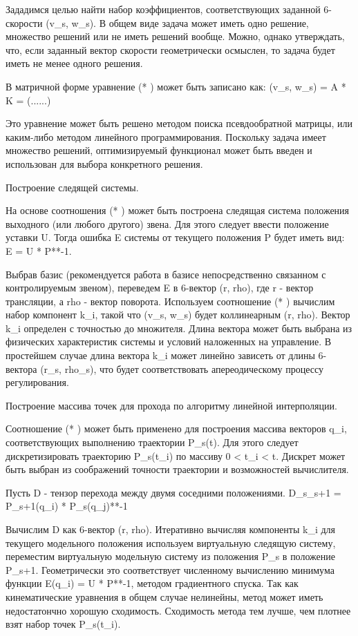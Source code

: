 \documentclass[12pt,a4paper,titlepage]{article}
\begin{document}
Зададимся целью найти набор коэффициентов, соответствующих заданной 6-скорости (v\_s, w\_s). В общем виде задача может иметь одно решение, множество решений или не иметь решений вообще. Можно, однако утверждать, что, если заданный вектор скорости геометрически осмыслен, то задача будет иметь не менее одного решения.

В матричной форме уравнение (* ) может быть записано как:
(v\_s, w\_s) = A * K = (......)

Это уравнение может быть решено методом поиска псевдообратной матрицы, или каким-либо методом линейного программирования. Поскольку задача имеет множество решений, оптимизируемый функционал может быть введен и использован для выбора конкретного решения.

Построение следящей системы. 

На основе соотношения (* ) может быть построена следящая система положения выходного (или любого другого) звена. Для этого следует ввести положение уставки U. Тогда ошибка E системы от текущего положения P будет иметь вид:
E = U * P**-1. 

Выбрав базис (рекомендуется работа в базисе непосредственно связанном с контролируемым звеном), переведем E в 6-вектор (r, rho), где r - вектор трансляции, а rho - вектор поворота. Используем соотношение (* ) вычислим набор компонент k\_i, такой что (v\_s, w\_s) будет коллинеарным (r, rho). Вектор k\_i определен с точностью до множителя. Длина вектора может быть выбрана из физических характеристик системы и условий наложенных на управление. В простейшем случае длина вектора k\_i может линейно зависеть от длины 6-вектора (r\_s, rho\_s), что будет соответствовать апереодическому процессу регулирования.   

Построение массива точек для прохода по алгоритму линейной интерполяции. 

Соотношение (* ) может быть применено для построения массива векторов q\_i, соответствующих выполнению траектории P\_s(t). Для этого следует дискретизировать траекторию P\_s(t\_i) по массиву 0 < t\_i < t. Дискрет может быть выбран из соображений точности траектории и возможностей вычислителя.

Пусть D - тензор перехода между двумя соседними положениями.
D\_s\_s+1 = P\_s+1(q\_i) * P\_s(q\_j)**-1

Вычислим D как 6-вектор (r, rho). Итеративно вычисляя компоненты k\_i для текущего модельного положения используем виртуальную следящую систему, переместим виртуальную модельную систему из положения P\_s в положение P\_s+1. Геометрически это соответствует численному вычислению минимума функции E(q\_i) = U * P**-1, методом градиентного спуска. Так как кинематические уравнения в общем случае нелинейны, метод может иметь недостатончно хорошую сходимость. Сходимость метода тем лучше, чем плотнее взят набор точек P\_s(t\_i).  
\end{document}
